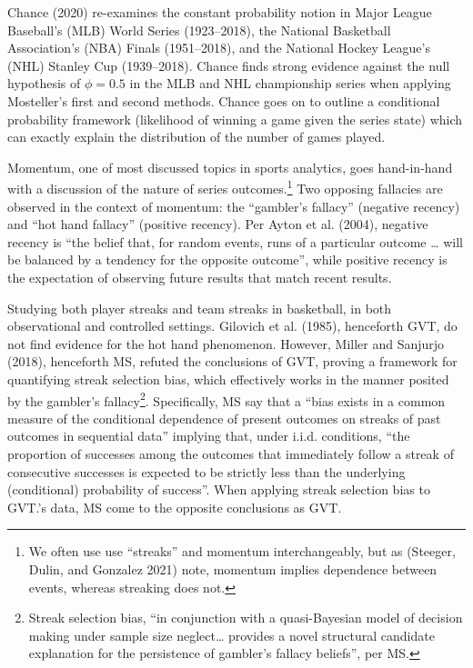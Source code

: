 \documentclass{article}
\begin{document}
Chance (2020) re-examines the constant probability notion in Major
League Baseball's (MLB) World Series (1923--2018), the National
Basketball Association's (NBA) Finals (1951--2018), and the National
Hockey League's (NHL) Stanley Cup (1939--2018). Chance finds strong
evidence against the null hypothesis of \(\phi = 0.5\) in the MLB and
NHL championship series when applying Mosteller's first and second
methods. Chance goes on to outline a conditional probability framework
(likelihood of winning a game given the series state) which can exactly
explain the distribution of the number of games played.

Momentum, one of most discussed topics in sports analytics, goes
hand-in-hand with a discussion of the nature of series
outcomes.\footnote{We often use use ``streaks'' and momentum
  interchangeably, but as (Steeger, Dulin, and Gonzalez 2021) note,
  momentum implies dependence between events, whereas streaking does
  not.} Two opposing fallacies are observed in the context of momentum:
the ``gambler's fallacy'' (negative recency) and ``hot hand fallacy''
(positive recency). Per Ayton et al. (2004), negative recency is ``the
belief that, for random events, runs of a particular outcome \ldots{}
will be balanced by a tendency for the opposite outcome'', while
positive recency is the expectation of observing future results that
match recent results.

Studying both player streaks and team streaks in basketball, in both
observational and controlled settings. Gilovich et al. (1985),
henceforth GVT, do not find evidence for the hot hand phenomenon.
However, Miller and Sanjurjo (2018), henceforth MS, refuted the
conclusions of GVT, proving a framework for quantifying streak selection
bias, which effectively works in the manner posited by the gambler's
fallacy\footnote{Streak selection bias, ``in conjunction with a
  quasi-Bayesian model of decision making under sample size
  neglect\ldots{} provides a novel structural candidate explanation for
  the persistence of gambler's fallacy beliefs'', per MS.}.
Specifically, MS say that a ``bias exists in a common measure of the
conditional dependence of present outcomes on streaks of past outcomes
in sequential data'' implying that, under i.i.d. conditions, ``the
proportion of successes among the outcomes that immediately follow a
streak of consecutive successes is expected to be strictly less than the
underlying (conditional) probability of success''. When applying streak
selection bias to GVT.'s data, MS come to the opposite conclusions as
GVT.
\end{document}
